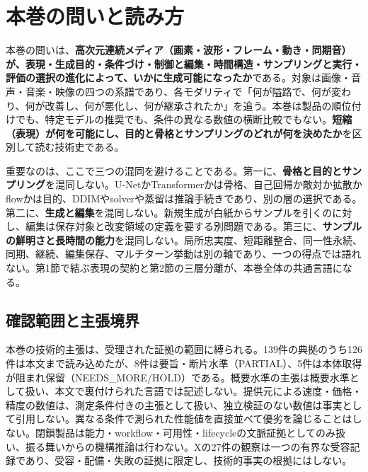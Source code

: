 \documentclass[lualatex,a4paper,10pt]{jlreq}
\begin{document}
\surveycover
\clearpage

\section*{本巻の問いと読み方}
本巻の問いは、\textbf{高次元連続メディア（画素・波形・フレーム・動き・同期音）が、表現・生成目的・条件づけ・制御と編集・時間構造・サンプリングと実行・評価の選択の進化によって、いかに生成可能になったか}である。対象は画像・音声・音楽・映像の四つの系譜であり、各モダリティで「何が隘路で、何が変わり、何が改善し、何が悪化し、何が継承されたか」を追う。本巻は製品の順位付けでも、特定モデルの推奨でも、条件の異なる数値の横断比較でもない。\textbf{短縮（表現）が何を可能にし、目的と骨格とサンプリングのどれが何を決めたか}を区別して読む技術史である。

重要なのは、ここで三つの混同を避けることである。第一に、\textbf{骨格と目的とサンプリング}を混同しない。U-NetかTransformerかは骨格、自己回帰か敵対か拡散かflowかは目的、DDIMやsolverや蒸留は推論手続きであり、別の層の選択である。第二に、\textbf{生成と編集}を混同しない。新規生成が白紙からサンプルを引くのに対し、編集は保存対象と改変領域の定義を要する別問題である。第三に、\textbf{サンプルの鮮明さと長時間の能力}を混同しない。局所忠実度、短距離整合、同一性永続、同期、継続、編集保存、マルチターン挙動は別の軸であり、一つの得点では語れない。第1節で結ぶ表現の契約と第2節の三層分離が、本巻全体の共通言語になる。

\subsection*{確認範囲と主張境界}
本巻の技術的主張は、受理された証拠の範囲に縛られる。139件の典拠のうち126件は本文まで読み込めたが、8件は要旨・断片水準（PARTIAL）、5件は本体取得が阻まれ保留（NEEDS\_MORE/HOLD）である。概要水準の主張は概要水準として扱い、本文で裏付けられた言語では記述しない。提供元による速度・価格・精度の数値は、測定条件付きの主張として扱い、独立検証のない数値は事実として引用しない。異なる条件で測られた性能値を直接並べて優劣を論じることはしない。閉鎖製品は能力・workflow・可用性・lifecycleの文脈証拠としてのみ扱い、振る舞いからの機構推論は行わない。Xの27件の観察は一つの有界な受容記録であり、受容・配備・失敗の証拠に限定し、技術的事実の根拠にはしない。
\end{document}

